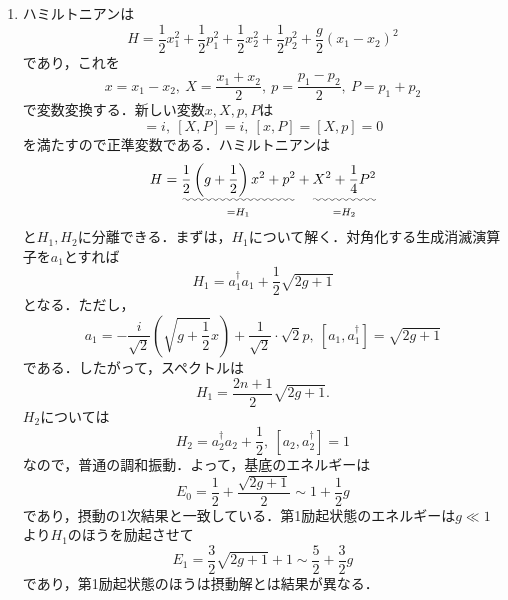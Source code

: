 \documentclass[a4paper,pdflatex,ja=standard]{bxjsarticle}
\begin{document}
\begin{enumerate}
  \item 
  ハミルトニアンは
  \begin{equation}
    H
    =
    \frac{1}{2}x_1^2
    +
    \frac{1}{2}p_1^2
    +
    \frac{1}{2}x_2^2
    +
    \frac{1}{2}p_2^2
    +
    \frac{g}{2}(x_1-x_2)^2
  \end{equation}
  であり，これを
  \begin{equation}
    x
    =
    x_1-x_2
    ,\ 
    X
    =
    \frac{x_1+x_2}{2}
    ,\ 
    p
    =
    \frac{p_1-p_2}{2}
    ,\ 
    P
    =
    p_1+p_2
  \end{equation}
  で変数変換する．新しい変数$x,X,p,P$は
  \begin{equation}
    [x,p]=i
    ,\ 
    [X,P]=i
    ,\ 
    [x,P]=[X,p]=0
  \end{equation}
  を満たすので正準変数である．ハミルトニアンは
  \begin{equation}
    H
    =
    \underset{=H_1}{\uwave{
      \frac{1}{2}\left( g+\frac{1}{2} \right)x^2+p^2
    }}
    +
    \underset{=H_2}{\uwave{
      X^2
      +
      \frac{1}{4}P^2
      \vphantom{\frac{1}{2}\left( g+\frac{1}{2} \right)x^2+p^2}
    }}
  \end{equation}
  と$H_1,H_2$に分離できる．まずは，$H_1$について解く．対角化する生成消滅演算子を$a_1$とすれば
  \begin{equation}
    H_1
    =
    a_1^{\dagger}a_1+\frac{1}{2}\sqrt{2g+1}
  \end{equation}
  となる．ただし，
  \begin{equation}
    a_1
    =
    -
    \frac{i}{\sqrt{2}}\left( \sqrt{g+\frac{1}{2}}x \right)
    +
    \frac{1}{\sqrt{2}}\cdot\sqrt{2}p
    ,\ 
    [a_1,a_1^{\dagger}]
    =
    \sqrt{2g+1}
  \end{equation}
  である．したがって，スペクトルは
  \begin{equation}
    H_1
    =
    \frac{2n+1}{2}\sqrt{2g+1}
    .
  \end{equation}
  $H_2$については
  \begin{equation}
    H_2
    =
    a_2^{\dagger}a_2
    +
    \frac{1}{2}
    ,\ 
    [a_2,a_2^{\dagger}]=1
  \end{equation}
  なので，普通の調和振動．よって，基底のエネルギーは
  \begin{equation}
    E_0
    =
    \frac{1}{2}
    +
    \frac{\sqrt{2g+1}}{2}
    \sim
    1+\frac{1}{2}g
  \end{equation}
  であり，摂動の1次結果と一致している．第1励起状態のエネルギーは$g\ll 1$より$H_1$のほうを励起させて
  \begin{equation}
    E_1
    =
    \frac{3}{2}\sqrt{2g+1}
    +
    1
    \sim
    \frac{5}{2}+\frac{3}{2}g
  \end{equation}
  であり，第1励起状態のほうは摂動解とは結果が異なる．

\end{enumerate}
\end{document}
